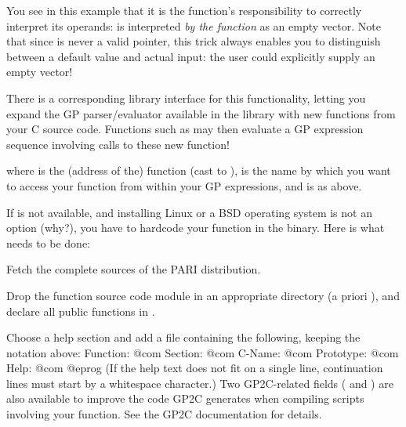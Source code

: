  You see in this example that it is the
function's responsibility to correctly interpret its operands:  is interpreted \emph{by the function} as an empty vector. Note that
since  is never a valid  pointer, this trick always
enables you to distinguish between a default value and actual input: the
user could explicitly supply an empty vector!


There is a corresponding library interface for this 
functionality, letting you expand the GP parser/evaluator available in the
library with new functions from your C source code. Functions such as
 may then evaluate a GP expression sequence involving calls
to these new function!


\noindent where  is the (address of the) function (cast to
),  is the name by which you want to access your
function from within your GP expressions, and  is as above.



If  is not available, and installing Linux or a BSD operating
system is not an option (why?), you have to hardcode your function in the
 binary. Here is what needs to be done:

\item Fetch the complete sources of the PARI distribution.

\item Drop the function source code module in an appropriate directory
(a priori ), and declare all public functions
in .

\item Choose a help section and add a file
containing the following, keeping the notation above:
\bprog
Function:  @com
Section:   @com
C-Name:    @com
Prototype: @com
Help:      @com
@eprog\noindent
(If the help text does not fit on a single line, continuation lines must
start by a whitespace character.) Two GP2C-related fields (
and ) are also available to improve the code GP2C generates when
compiling scripts involving your function. See the GP2C documentation for
details.

